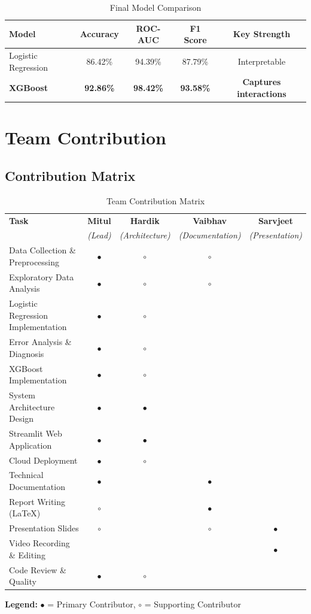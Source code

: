 \documentclass[12pt,a4paper]{article}
\begin{document}
\begin{table}[H]
\centering
\caption{Final Model Comparison}
\begin{tabular}{lcccc}
\toprule
\textbf{Model} & \textbf{Accuracy} & \textbf{ROC-AUC} & \textbf{F1 Score} & \textbf{Key Strength} \\
\midrule
Logistic Regression & 86.42\% & 94.39\% & 87.79\% & Interpretable \\
\textbf{XGBoost} & \textbf{92.86\%} & \textbf{98.42\%} & \textbf{93.58\%} & \textbf{Captures interactions} \\
\bottomrule
\end{tabular}
\end{table}

\newpage

\section{Team Contribution}

\subsection{Contribution Matrix}

\begin{table}[H]
\centering
\caption{Team Contribution Matrix}
\begin{tabular}{lcccc}
\toprule
\textbf{Task} & \textbf{Mitul} & \textbf{Hardik} & \textbf{Vaibhav} & \textbf{Sarvjeet} \\
 & \textit{(Lead)} & \textit{(Architecture)} & \textit{(Documentation)} & \textit{(Presentation)} \\
\midrule
Data Collection \& Preprocessing & $\bullet$ & $\circ$ & $\circ$ & \\
Exploratory Data Analysis & $\bullet$ & $\circ$ & $\circ$ & \\
Logistic Regression Implementation & $\bullet$ & $\circ$ & & \\
Error Analysis \& Diagnosis & $\bullet$ & $\circ$ & & \\
XGBoost Implementation & $\bullet$ & $\circ$ & & \\
System Architecture Design & $\bullet$ & $\bullet$ & & \\
Streamlit Web Application & $\bullet$ & $\bullet$ & & \\
Cloud Deployment & $\bullet$ & $\circ$ & & \\
Technical Documentation & $\bullet$ & & $\bullet$ & \\
Report Writing (LaTeX) & $\circ$ & & $\bullet$ & \\
Presentation Slides & $\circ$ & & $\circ$ & $\bullet$ \\
Video Recording \& Editing & & & & $\bullet$ \\
Code Review \& Quality & $\bullet$ & $\circ$ & & \\
\bottomrule
\end{tabular}

\vspace{0.3cm}
\textbf{Legend:} $\bullet$ = Primary Contributor, $\circ$ = Supporting Contributor
\end{table}
\end{document}
